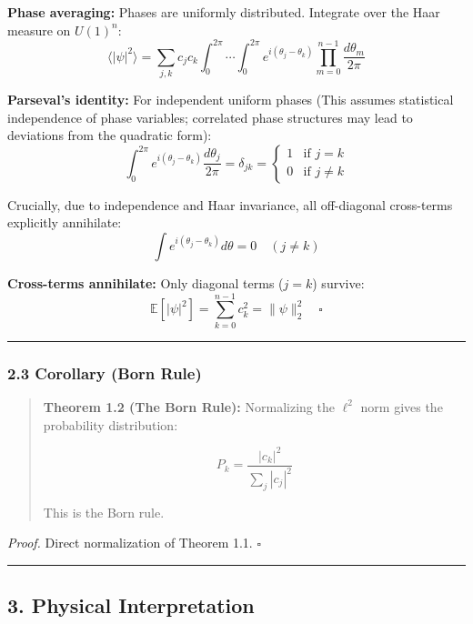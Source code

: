 \documentclass[
]{article}
\begin{document}
\textbf{Phase averaging:} Phases are uniformly distributed. Integrate
over the Haar measure on \(U(1)^n\):
\[\langle |\psi|^2 \rangle = \sum_{j,k} c_j c_k \int_0^{2\pi} \cdots \int_0^{2\pi} e^{i(\theta_j - \theta_k)} \prod_{m=0}^{n-1} \frac{d\theta_m}{2\pi}\]

\textbf{Parseval's identity:} For independent uniform phases (This
assumes statistical independence of phase variables; correlated phase
structures may lead to deviations from the quadratic form):
\[\int_0^{2\pi} e^{i(\theta_j - \theta_k)} \frac{d\theta_j}{2\pi} = \delta_{jk} = \begin{cases} 1 & \text{if } j = k \\ 0 & \text{if } j \neq k \end{cases}\]

Crucially, due to independence and Haar invariance, all off-diagonal
cross-terms explicitly annihilate:
\[ \int e^{i(\theta_j - \theta_k)} d\theta = 0 \quad (j \neq k) \]

\textbf{Cross-terms annihilate:} Only diagonal terms (\(j = k\))
survive:
\[ \mathbb{E}[|\psi|^2] = \sum_{k=0}^{n-1} c_k^2 = \|\psi\|_2^2 \quad \square \]

\begin{center}\rule{0.5\linewidth}{0.5pt}\end{center}

\subsubsection{2.3 Corollary (Born Rule)}\label{corollary-born-rule}

\begin{quote}
\textbf{Theorem 1.2 (The Born Rule):} Normalizing the \(\ell^2\) norm
gives the probability distribution:

\[P_k = \frac{|c_k|^2}{\sum_j |c_j|^2}\]

This is the Born rule.
\end{quote}

\emph{Proof.} Direct normalization of Theorem 1.1. \(\square\)

\begin{center}\rule{0.5\linewidth}{0.5pt}\end{center}

\subsection{3. Physical Interpretation}\label{physical-interpretation}
\end{document}
